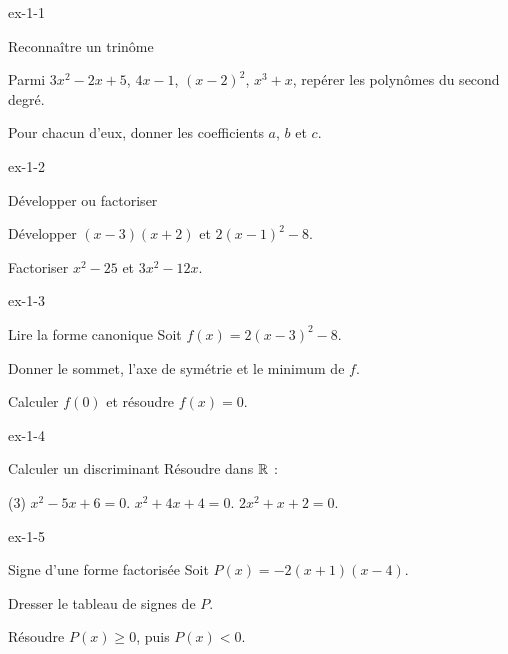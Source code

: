 \begin{blocLivre}{ex-1-1}
\begin{exercice}[1]{Reconnaître un trinôme}
\begin{questions}
\item Parmi $3x^2-2x+5$, $4x-1$, $(x-2)^2$, $x^3+x$, repérer les polynômes du second degré.
\item Pour chacun d'eux, donner les coefficients $a$, $b$ et $c$.
\end{questions}
\end{exercice}
\end{blocLivre}
\begin{blocLivre}{ex-1-2}
\begin{exercice}[1]{Développer ou factoriser}
\begin{questions}
\item Développer $(x-3)(x+2)$ et $2(x-1)^2-8$.
\item Factoriser $x^2-25$ et $3x^2-12x$.
\end{questions}
\end{exercice}
\end{blocLivre}
\begin{blocLivre}{ex-1-3}
\begin{exercice}[1]{Lire la forme canonique}
Soit $f(x)=2(x-3)^2-8$.
\begin{questions}
\item Donner le sommet, l'axe de symétrie et le minimum de $f$.
\item Calculer $f(0)$ et résoudre $f(x)=0$.
\end{questions}
\end{exercice}
\end{blocLivre}
\begin{blocLivre}{ex-1-4}
\begin{exercice}[1]{Calculer un discriminant}
Résoudre dans $\mathbb{R}$ :
\begin{tasks}(3)
\task $x^2-5x+6=0$.
\task $x^2+4x+4=0$.
\task $2x^2+x+2=0$.
\end{tasks}
\end{exercice}
\end{blocLivre}
\begin{blocLivre}{ex-1-5}
\begin{exercice}[1]{Signe d'une forme factorisée}
Soit $P(x)=-2(x+1)(x-4)$.
\begin{questions}
\item Dresser le tableau de signes de $P$.
\item Résoudre $P(x)\geq0$, puis $P(x)<0$.
\end{questions}
\end{exercice}
\end{blocLivre}
